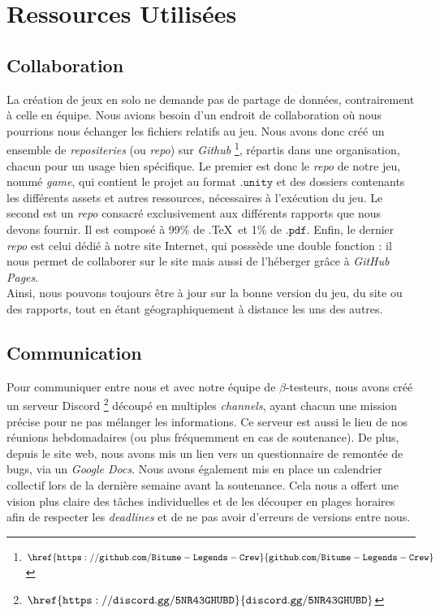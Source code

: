 \documentclass[12pt,a4paper]{article}
\begin{document}
\section{Ressources Utilisées}
    \subsection{Collaboration}
        La création de jeux en solo ne demande pas de partage de données, contrairement 
        à celle en équipe. Nous avions besoin d'un endroit de collaboration où nous 
        pourrions nous échanger les fichiers relatifs au jeu. 
        Nous avons donc créé un ensemble de \textit{repositeries} (ou \textit{repo}) sur \textsl{Github}
        \footnote{\(\mathtt{\href{https://github.com/Bitume-Legends-Crew}
        {github.com/Bitume-Legends-Crew}}\)}, répartis dans une organisation,
        chacun pour un usage bien spécifique. Le premier est donc le \textit{repo} de
        notre jeu, nommé \textit{game}, qui contient le projet au format \(\mathtt{.unity}\)
        et des dossiers contenants les différents assets et autres ressources,
        nécessaires à l'exécution du jeu. 
        Le second est un \textit{repo} consacré exclusivement aux différents rapports 
        que nous devons fournir. Il est composé à 99\% de .\TeX\, et 1\% de \(\mathtt{.pdf}\).
        Enfin, le dernier \textit{repo} est celui dédié à notre site Internet, qui
        posssède une double fonction : il nous permet de collaborer sur le site
        mais aussi de l'héberger grâce à \textsl{GitHub Pages}.\\
        \indent Ainsi, nous pouvons toujours être à jour sur la bonne version du jeu,
        du site ou des rapports, tout en étant géographiquement à distance les uns 
        des autres.

    \subsection{Communication}
        Pour communiquer entre nous et avec notre équipe de \(\beta\)-testeurs, nous
        avons créé un serveur Discord \footnote{\(\mathtt{\href{https://discord.
        gg/5NR43GHUBD}{discord.gg/5NR43GHUBD}}\)} découpé en multiples 
        \textit{channels}, ayant chacun une mission précise pour ne pas mélanger les
        informations. Ce serveur est aussi le lieu de nos réunions hebdomadaires 
        (ou plus fréquemment en cas de soutenance). De plus, depuis le site web, nous
        avons mis un lien vers un questionnaire de remontée de bugs, via un \textsl{Google Docs}.
        Nous avons également mis en place un calendrier collectif lors de la
        dernière semaine avant la soutenance. Cela nous a offert une vision plus
        claire des tâches individuelles et de les découper en plages horaires afin de 
        respecter les \textit{deadlines} et de ne pas avoir d'erreurs de versions
        entre nous.
\end{document}
